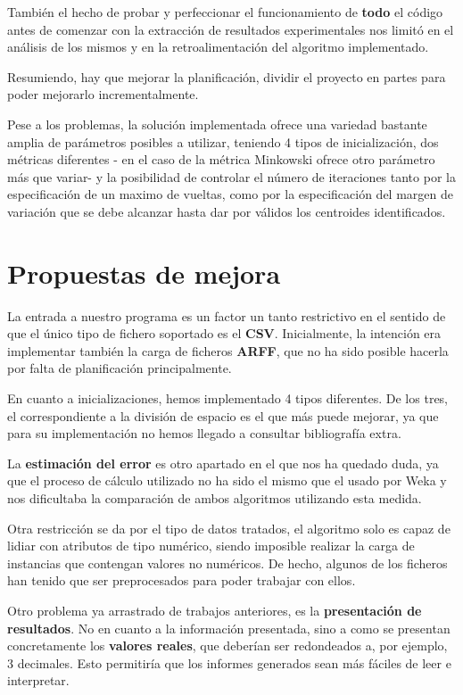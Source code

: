 \documentclass[a4paper]{report}
\begin{document}
	También el hecho de probar y perfeccionar el funcionamiento de \textbf{todo} el código antes de comenzar con la extracción de resultados experimentales nos limitó en el análisis de los mismos y en la retroalimentación del algoritmo implementado.
	
	Resumiendo, hay que mejorar la planificación, dividir el proyecto en partes para poder mejorarlo incrementalmente.
	
	Pese a los problemas, la solución implementada ofrece una variedad bastante amplia de parámetros posibles a utilizar, teniendo 4 tipos de inicialización, dos métricas diferentes - en el caso de la métrica Minkowski ofrece otro parámetro más que variar- y la posibilidad de controlar el número de iteraciones tanto por la especificación de un maximo de vueltas, como por la especificación del margen de variación que se debe alcanzar hasta dar por válidos los centroides identificados.
	
	\section{Propuestas de mejora}
	
	La entrada a nuestro programa es un factor un tanto restrictivo en el sentido de que el único tipo de fichero soportado es el \textbf{CSV}. Inicialmente, la intención era implementar también la carga de ficheros \textbf{ARFF}, que no ha sido posible hacerla por falta de planificación principalmente.
	
	En cuanto a inicializaciones, hemos implementado 4 tipos diferentes. De los tres, el correspondiente a la división de espacio es el que más puede mejorar, ya que para su implementación no hemos llegado a consultar bibliografía extra.
	
	La \textbf{estimación del error} es otro apartado en el que nos ha quedado duda, ya que el proceso de cálculo utilizado no ha sido el mismo que el usado por Weka y nos dificultaba la comparación de ambos algoritmos utilizando esta medida.
	
	Otra restricción se da por el tipo de datos tratados, el algoritmo solo es capaz de lidiar con atributos de tipo numérico, siendo imposible realizar la carga de instancias que contengan valores no numéricos. De hecho, algunos de los ficheros han tenido que ser preprocesados para poder trabajar con ellos.
	
	Otro problema ya arrastrado de trabajos anteriores, es la \textbf{presentación de resultados}. No en cuanto a la información presentada, sino a como se presentan concretamente los\textbf{ valores reales}, que deberían ser redondeados a, por ejemplo, 3 decimales. Esto permitiría que los informes generados sean más fáciles de leer e interpretar.
\end{document}

